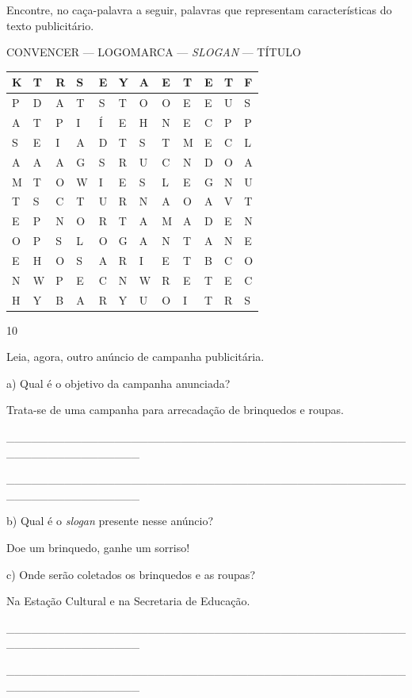 \begin{boxlist}
{Encontre, no caça-palavra a seguir, palavras que representam
características do texto publicitário.

CONVENCER --- LOGOMARCA --- \textit{SLOGAN} --- TÍTULO

\begin{longtable}[]{@{}llllllllllll@{}}
\toprule
K & T & R & S & E & Y & A & E & T & E & T & F\tabularnewline
\midrule
\endhead
P & D & A & T & S & T & O & O & E & E & U & S\tabularnewline
A & T & P & I & Í & E & H & N & E & C & P & P\tabularnewline
S & E & I & A & D & T & S & T & M & E & C & L\tabularnewline
A & A & A & G & S & R & U & C & N & D & O & A\tabularnewline
M & T & O & W & I & E & S & L & E & G & N & U\tabularnewline
T & S & C & T & U & R & N & A & O & A & V & T\tabularnewline
E & P & N & O & R & T & A & M & A & D & E & N\tabularnewline
O & P & S & L & O & G & A & N & T & A & N & E\tabularnewline
E & H & O & S & A & R & I & E & T & B & C & O\tabularnewline
N & W & P & E & C & N & W & R & E & T & E & C\tabularnewline
H & Y & B & A & R & Y & U & O & I & T & R & S\tabularnewline
\bottomrule
\end{longtable}

\num{10}

Leia, agora, outro anúncio de campanha publicitária.


a) Qual é o objetivo da campanha anunciada?

Trata-se de uma campanha para arrecadação de brinquedos e roupas.

\protect\hypertarget{_Hlk127709586}{}{}\_\_\_\_\_\_\_\_\_\_\_\_\_\_\_\_\_\_\_\_\_\_\_\_\_\_\_\_\_\_\_\_\_\_\_\_\_\_\_\_\_\_\_\_\_\_\_\_\_\_\_\_\_\_\_\_\_\_\_\_\_\_\_\_

\_\_\_\_\_\_\_\_\_\_\_\_\_\_\_\_\_\_\_\_\_\_\_\_\_\_\_\_\_\_\_\_\_\_\_\_\_\_\_\_\_\_\_\_\_\_\_\_\_\_\_\_\_\_\_\_\_\_\_\_\_\_\_\_

b) Qual é o \textit{slogan} presente nesse anúncio?

Doe um brinquedo, ganhe um sorriso!

c) Onde serão coletados os brinquedos e as roupas?

Na Estação Cultural e na Secretaria de Educação.

\_\_\_\_\_\_\_\_\_\_\_\_\_\_\_\_\_\_\_\_\_\_\_\_\_\_\_\_\_\_\_\_\_\_\_\_\_\_\_\_\_\_\_\_\_\_\_\_\_\_\_\_\_\_\_\_\_\_\_\_\_\_\_\_

\_\_\_\_\_\_\_\_\_\_\_\_\_\_\_\_\_\_\_\_\_\_\_\_\_\_\_\_\_\_\_\_\_\_\_\_\_\_\_\_\_\_\_\_\_\_\_\_\_\_\_\_\_\_\_\_\_\_\_\_\_\_\_\_

}
\end{boxlist}

